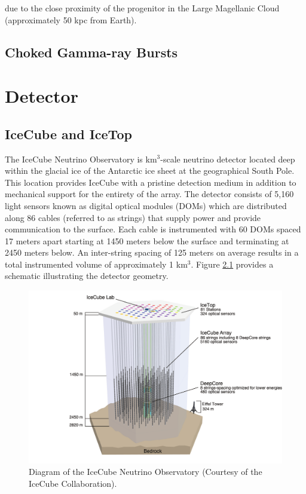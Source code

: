 \documentclass{gatech-thesis}
\begin{document}
due to the close proximity of the progenitor in the Large Magellanic Cloud (approximately 50 kpc  from Earth).

\section{Choked Gamma-ray Bursts}



\chapter{Detector}
\section{IceCube and IceTop}
The IceCube Neutrino Observatory \cite{2006APh....26..155I} is km$^{3}$-scale neutrino detector located deep within the glacial ice of the Antarctic ice sheet at the geographical South Pole. This location provides IceCube with a pristine detection medium in addition to mechanical support for the entirety of the array. The detector consists of 5,160 light sensors known as digital optical modules (DOMs) which are distributed along 86 cables (referred to as strings) that supply power and provide communication to the surface. Each cable is instrumented with 60 DOMs spaced 17 meters apart starting at 1450 meters below the surface and terminating at 2450 meters below. An inter-string spacing of 125 meters on average results in a total instrumented volume of approximately 1 km$^{3}$. Figure \ref{fig:icecube} provides a schematic illustrating the detector geometry.

\begin{figure}[ht]
  \begin{center}
    \includegraphics[width=1.0\textwidth,keepaspectratio]{ArrayWSeasonsLabels.pdf}
  \end{center}
  \caption{Diagram of the IceCube Neutrino Observatory (Courtesy of the IceCube Collaboration).}
  \label{fig:icecube}
\end{figure}
\end{document}
